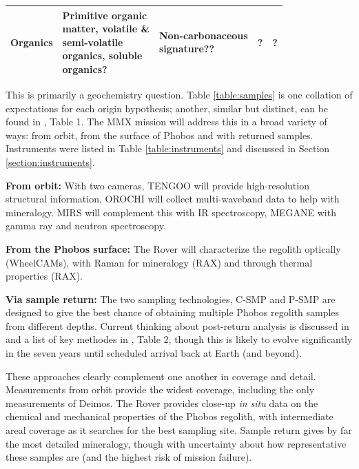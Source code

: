 \begin{table}[hbt!]
\begin{tabular}{|l|l|l|l|l|}
		Organics & 
		\makecell{Primitive organic\\ matter, volatile \& \\semi-volatile \\organics, soluble \\organics?} & 
		\makecell{Non-carbonaceous \\signature??} & 
		? & 
		? \\
		\hline
	\end{tabular}
\end{table}

This is primarily a geochemistry question. Table \ref{table:samples} is one collation of expectations for each origin hypothesis; another, similar but distinct, can be found in \citet{murchie_value_2014}{, Table 1}. The MMX mission will address this in a broad variety of ways: from orbit, from the surface of Phobos and with returned samples. Instruments were listed in Table \ref{table:instruments} and discussed in Section \ref{section:instruments}.

\textbf{From orbit:} With two cameras, TENGOO will provide high-resolution structural information, OROCHI will collect multi-waveband data to help with mineralogy. MIRS will complement this with IR spectroscopy, MEGANE with gamma ray and neutron spectroscopy.

\textbf{From the Phobos surface:} The Rover will characterize the regolith optically (WheelCAMs), with Raman for mineralogy (RAX) and through thermal properties (RAX).

\textbf{Via sample return:} The two sampling technologies, C-SMP and P-SMP are designed to give the best chance of obtaining multiple Phobos regolith samples from different depths. Current thinking about post-return analysis is discussed in \citet{fujiya_analytical_2021} and a list of key methodes in \citet{usui_importance_2020}, Table 2, though this is likely to evolve significantly in the seven years until scheduled arrival back at Earth (and beyond).

These approaches clearly complement one another in coverage and detail. Measurements from orbit provide the widest coverage, including the only measurements of Deimos. The Rover provides close-up \textit{in situ} data on the chemical and mechanical properties of the Phobos regolith, with intermediate areal coverage as it searches for the best sampling site.  Sample return gives by far the most detailed mineralogy, though with uncertainty about how representative these samples are (and the highest risk of mission failure).


